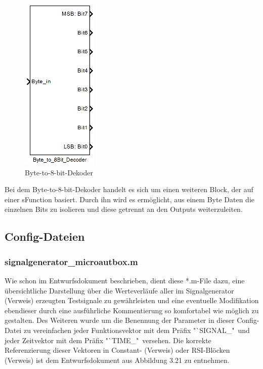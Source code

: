 \documentclass[fontsize = 12pt, paper = a4]{scrreprt}
\begin{document}
\begin{itemize}
\begin{figure}[h]
\centering
\includegraphics[scale = 0.8]{byteto8bit}
\caption[Byte-to-8-bit-Dekoder]{Byte-to-8-bit-Dekoder}
\label{Byte-to-8-bit-Dekoder}
\end{figure}

Bei dem Byte-to-8-bit-Dekoder handelt es sich um einen weiteren Block, der auf einer sFunction basiert. Durch ihn wird es ermöglicht, aus einem Byte Daten die einzelnen Bits zu isolieren und diese getrennt an den Outputs weiterzuleiten.

\end{itemize}




\subsection{Config-Dateien}

\subsubsection{signalgenerator\_microautbox.m}

Wie schon im Entwurfsdokument beschrieben, dient diese *.m-File dazu, eine übersichtliche Darstellung über die Werteverläufe aller im Signalgenerator (Verweis) erzeugten Testsignale zu gewährleisten und eine eventuelle Modifikation ebendieser durch eine ausführliche Kommentierung so komfortabel wie möglich zu gestalten. Des Weiteren wurde um die Benennung der Parameter in dieser Config-Datei zu vereinfachen jeder Funktionsvektor mit dem Präfix "`SIGNAL\_"\ und jeder Zeitvektor mit dem Präfix "`TIME\_"\ versehen. Die korrekte Referenzierung dieser Vektoren in Constant- (Verweis) oder RSI-Blöcken (Verweis) ist dem Entwurfsdokument aus Abbildung 3.21 zu entnehmen.  
\end{document}
